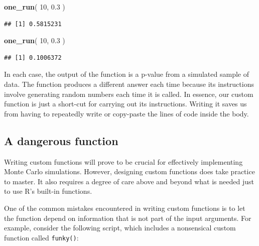 \documentclass[
]{book}
\newenvironment{Shaded}{\begin{snugshade}}{\end{snugshade}}
\newcommand{\DecValTok}[1]{\textcolor[rgb]{0.00,0.00,0.81}{#1}}
\newcommand{\FloatTok}[1]{\textcolor[rgb]{0.00,0.00,0.81}{#1}}
\newcommand{\FunctionTok}[1]{\textcolor[rgb]{0.13,0.29,0.53}{\textbf{#1}}}
\newcommand{\NormalTok}[1]{#1}
\begin{document}
\begin{Shaded}
\begin{Highlighting}[]
\FunctionTok{one\_run}\NormalTok{( }\DecValTok{10}\NormalTok{, }\FloatTok{0.3}\NormalTok{ )}
\end{Highlighting}
\end{Shaded}

\begin{verbatim}
## [1] 0.5815231
\end{verbatim}

\begin{Shaded}
\begin{Highlighting}[]
\FunctionTok{one\_run}\NormalTok{( }\DecValTok{10}\NormalTok{, }\FloatTok{0.3}\NormalTok{ )}
\end{Highlighting}
\end{Shaded}

\begin{verbatim}
## [1] 0.1006372
\end{verbatim}

In each case, the output of the function is a p-value from a simulated sample of data. The function produces a different answer each time because its instructions involve generating random numbers each time it is called.
In essence, our custom function is just a short-cut for carrying out its instructions.
Writing it saves us from having to repeatedly write or copy-paste the lines of code inside the body.

\subsection{A dangerous function}\label{a-dangerous-function}

Writing custom functions will prove to be crucial for effectively implementing Monte Carlo simulations.
However, designing custom functions does take practice to master.
It also requires a degree of care above and beyond what is needed just to use R's built-in functions.

One of the common mistakes encountered in writing custom functions is to let the function depend on information that is not part of the input arguments.
For example, consider the following script, which includes a nonsensical custom function called \texttt{funky()}:
\end{document}
